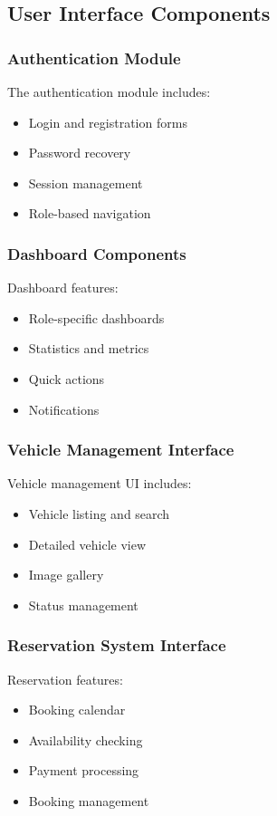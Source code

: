 \subsection{User Interface Components}
\subsubsection{Authentication Module}
The authentication module includes:

\begin{itemize}
    \item Login and registration forms
    \item Password recovery
    \item Session management
    \item Role-based navigation
\end{itemize}

\subsubsection{Dashboard Components}
Dashboard features:

\begin{itemize}
    \item Role-specific dashboards
    \item Statistics and metrics
    \item Quick actions
    \item Notifications
\end{itemize}

\subsubsection{Vehicle Management Interface}
Vehicle management UI includes:

\begin{itemize}
    \item Vehicle listing and search
    \item Detailed vehicle view
    \item Image gallery
    \item Status management
\end{itemize}

\subsubsection{Reservation System Interface}
Reservation features:

\begin{itemize}
    \item Booking calendar
    \item Availability checking
    \item Payment processing
    \item Booking management
\end{itemize}

